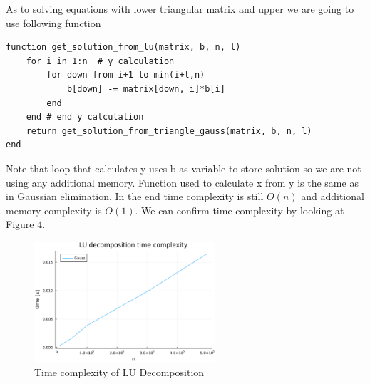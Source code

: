 \documentclass[11pt]{article}
\begin{document}
As to solving equations with lower triangular matrix and upper we are going to use following function
\begin{lstlisting}
function get_solution_from_lu(matrix, b, n, l)
    for i in 1:n  # y calculation
        for down from i+1 to min(i+l,n)
            b[down] -= matrix[down, i]*b[i]
        end
    end # end y calculation
    return get_solution_from_triangle_gauss(matrix, b, n, l)
end
\end{lstlisting}
Note that loop that calculates y uses b as variable to store solution so we are not using any additional memory.
Function used to calculate x from y is the same as in Gaussian elimination.
In the end time complexity is still $O(n)$ and additional memory complexity is $O(1)$. We can confirm time complexity by looking at Figure $4$.
\begin{figure}[h]
    \centering
    \includegraphics[width=0.6\textwidth]{lu_time_complexity.png}
    \caption{Time complexity of LU Decomposition}
\end{figure}
\end{document}

